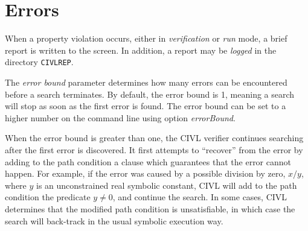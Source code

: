 \begin{optionlist}
\end{optionlist}

\section{Errors}
\label{sec:errors}

When a property violation occurs, either in \emph{verification} or
\emph{run} mode, a brief report is written to the screen.  In
addition, a report may be \emph{logged} in the directory
\texttt{CIVLREP}.

The \emph{error bound} parameter determines how many errors can be
encountered before a search terminates.  By default, the error bound
is 1, meaning a search will stop as soon as the first error is found.
The error bound can be set to a higher number on the command line
using option \emph{errorBound}.

When the error bound is greater than one, the CIVL verifier continues
searching after the first error is discovered.  It first attempts to
``recover'' from the error by adding to the path condition a clause
which guarantees that the error cannot happen.  For example, if the
error was caused by a possible division by zero, $x/y$, where $y$ is
an unconstrained real symbolic constant, CIVL will add to the path
condition the predicate $y\neq 0$, and continue the search.  In some
cases, CIVL determines that the modified path condition is
unsatisfiable, in which case the search will back-track in the usual
symbolic execution way.

